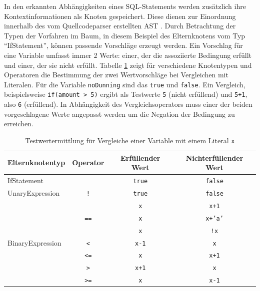 In den erkannten Abhängigkeiten eines SQL-Statements werden zusätzlich ihre Kontextinformationen als Knoten gespeichert.
Diese dienen zur Einordnung innerhalb des vom Quellcodeparser erstellten AST \cite{Horschig2014}.
Durch Betrachtung der Typen der Vorfahren im Baum, in diesem Beispiel des Elternknotens vom Typ ``IfStatement'', können passende Vorschläge erzeugt werden.
Ein Vorschlag für eine Variable umfasst immer 2 Werte: einer, der die assoziierte Bedingung erfüllt und einer, der sie nicht erfüllt.
Tabelle \ref{tab:tableforgeneratedvalues} zeigt für verschiedene Knotentypen und Operatoren die Bestimmung der zwei Wertvorschläge bei Vergleichen mit Literalen.
Für die Variable \texttt{noDunning} sind das \texttt{true} und \texttt{false}.
Ein Vergleich, beispielsweise \texttt{if(amount > 5)} ergibt als Testwerte \texttt{5} (nicht erfüllend) und \texttt{5+1}, also \texttt{6} (erfüllend).
In Abhängigkeit des Vergleichsoperators muss einer der beiden vorgeschlagene Werte angepasst werden um die Negation der Bedingung zu erreichen.

\begin{table}[ht!]
	\centering
	\begin{tabular}{ |l|c|c|c| }
		\hline
		Elternknotentyp 								  & Operator 											& Erfüllender Wert 	& Nichterfüllender Wert\\
		\hline
		\multicolumn{2}{|l|}{IfStatement} 																& \texttt{true} 		& \texttt{false} 	\\
		\hline
		UnaryExpression 								  & \texttt{!} 										& \texttt{true} 		& \texttt{false} 	\\
		\hline
		\multirow{7}{*}{BinaryExpression} & \multirow{3}{*}{\texttt{==}} 	& \texttt{x} 				& \texttt{x+1}		\\ \cline{3-4}
																		  & 															& \texttt{x} 				& \texttt{x+'a'}	\\ \cline{3-4}
																		  & 															& \texttt{x} 				& \texttt{!x}			\\ \cline{2-4}
																		  & \texttt{<} 										& \texttt{x-1} 			& \texttt{x}			\\ \cline{2-4}
																		  & \texttt{<=} 									& \texttt{x} 				& \texttt{x+1}		\\ \cline{2-4}
																		  & \texttt{>} 										& \texttt{x+1} 			& \texttt{x}			\\ \cline{2-4}
																		  & \texttt{>=} 									& \texttt{x} 				& \texttt{x-1}		\\
		\hline
	\end{tabular}
	\caption{Testwertermittlung für Vergleiche einer Variable mit einem Literal \texttt{x}}
	\label{tab:tableforgeneratedvalues}
\end{table}

